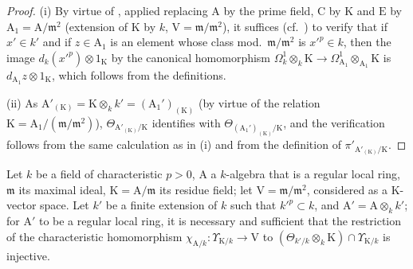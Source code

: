 \begin{proof}
(i) By virtue of , applied replacing $\mathrm{A}$ by the prime field, $\mathrm{C}$ by $\mathrm{K}$ and $\mathrm{E}$ by $\mathrm{A}_1=\mathrm{A}/\mathfrak{m}^2$ (extension of $\mathrm{K}$ by $k$, $\mathrm{V}=\mathfrak{m}/\mathfrak{m}^2$), it suffices (cf.~) to verify that if $x'\in k'$ and if $z\in\mathrm{A}_1$ is an element whose class mod.~$\mathfrak{m}/\mathfrak{m}^2$ is $x'^p\in k$, then the image $d_k(x'^p)\otimes 1_\mathrm{K}$ by the canonical homomorphism $\Omega^1_k\otimes_k\mathrm{K}\to\Omega^1_{\mathrm{A}_1}\otimes_{\mathrm{A}_1}\mathrm{K}$ is $d_{\mathrm{A}_1}z\otimes 1_\mathrm{K}$, which follows from the definitions.

(ii) As $\mathrm{A}'_{(\mathrm{K})}=\mathrm{K}\otimes_kk'=(\mathrm{A}_1')_{(\mathrm{K})}$ (by virtue of the relation $\mathrm{K}=\mathrm{A}_1/(\mathfrak{m}/\mathfrak{m}^2)$), $\Theta_{\mathrm{A}'_{(\mathrm{K})}/\mathrm{K}}$ identifies with $\Theta_{(\mathrm{A}_1')_{(\mathrm{K})}/\mathrm{K}}$, and the verification follows from the same calculation as in (i) and from the definition of $\pi'_{\mathrm{A}'_{(\mathrm{K})}/\mathrm{K}}$.
\end{proof}

\begin{proposition}[22.5.7]
\label{0.22.5.7}
Let $k$ be a field of characteristic $p>0$, $\mathrm{A}$ a $k$-algebra that is a regular local ring, $\mathfrak{m}$ its maximal ideal, $\mathrm{K}=\mathrm{A}/\mathfrak{m}$ its residue field; let $\mathrm{V}=\mathfrak{m}/\mathfrak{m}^2$, considered as a $\mathrm{K}$-vector space.
Let $k'$ be a finite extension of $k$ such that $k'^p\subset k$, and $\mathrm{A}'=\mathrm{A}\otimes_kk'$; for $\mathrm{A}'$ to be a regular local ring, it is necessary and sufficient that the restriction of the characteristic homomorphism $\chi_{\mathrm{A}/k}:\Upsilon_{\mathrm{K}/k}\to\mathrm{V}$  to $(\Theta_{k'/k}\otimes_k\mathrm{K})\cap\Upsilon_{\mathrm{K}/k}$ is injective.
\end{proposition}

